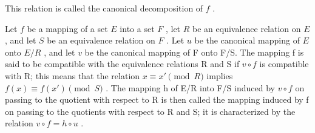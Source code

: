 This relation is called the canonical decomposition of \(f\) .

Let \(f\) be a mapping of a set \(E\) into a set \(F\) , let \(R\) be an equivalence relation on \(E\) , and let \(S\) be an equivalence relation on \(F\) . Let \(u\) be the canonical mapping of \(E\) onto \(E / R\) , and let \(v\) be the canonical mapping of F onto F/S. The mapping f is said to be compatible with the equivalence relations R and S if \(v \circ f\) is compatible with R; this means that the relation \(x \equiv x' \pmod{R}\) implies \(f(x) \equiv f(x') \pmod{S}\) . The mapping h of E/R into F/S induced by \(v \circ f\) on passing to the quotient with respect to R is then called the mapping induced by f on passing to the quotients with respect to R and S; it is characterized by the relation \(v \circ f = h \circ u\) .

